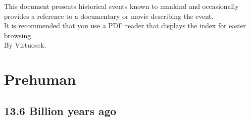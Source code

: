 \documentclass[11pt]{report}
\begin{document}
\begin{center}
\vspace*{\fill}
This document presents historical events known to mankind and occasionally provides a reference to a documentary or movie describing the event.\\
\vspace{5mm}
It is recommended that you use a PDF reader that displays the index for easier browsing.\\
\vspace{1cm}
By Virtuosek.\\ \vspace{5cm}
\end{center}

\vspace*{\fill}
\thispagestyle{empty}
\clearpage
\setcounter{page}{1}

\part{Prehuman}
\chapter{13.6 Billion years ago}
\end{document}
